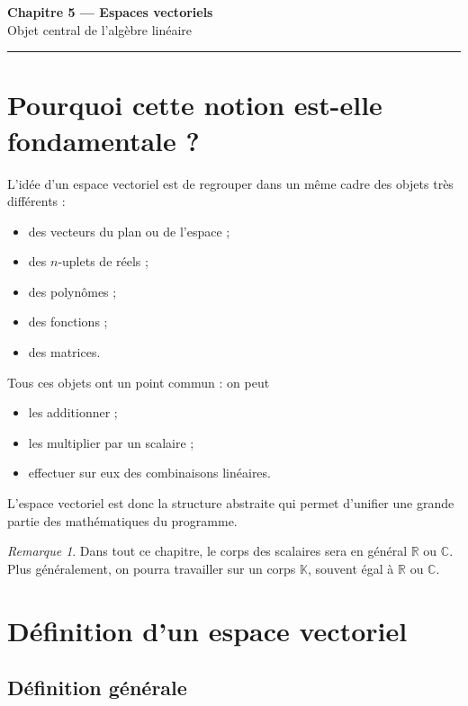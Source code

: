 \documentclass[11pt,a4paper]{article}
\theoremstyle{remark}
\newtheorem{remarque}[definition]{Remarque}
\newcommand{\R}{\mathbb{R}}
\newcommand{\C}{\mathbb{C}}
\newcommand{\K}{\mathbb{K}}
\begin{document}
\begin{center}
    {\LARGE \textbf{Chapitre 5 --- Espaces vectoriels}}\\[0.5em]
    {\large Objet central de l’algèbre linéaire}
\end{center}

\hrule
\vspace{1em}

\tableofcontents

\newpage

\section{Pourquoi cette notion est-elle fondamentale ?}

L’idée d’un espace vectoriel est de regrouper dans un même cadre des objets très différents :
\begin{itemize}
    \item des vecteurs du plan ou de l’espace ;
    \item des \(n\)-uplets de réels ;
    \item des polynômes ;
    \item des fonctions ;
    \item des matrices.
\end{itemize}

Tous ces objets ont un point commun : on peut
\begin{itemize}
    \item les additionner ;
    \item les multiplier par un scalaire ;
    \item effectuer sur eux des combinaisons linéaires.
\end{itemize}

L’espace vectoriel est donc la structure abstraite qui permet d’unifier une grande partie des mathématiques du programme.

\begin{remarque}
Dans tout ce chapitre, le corps des scalaires sera en général \(\R\) ou \(\C\).  
Plus généralement, on pourra travailler sur un corps \(\K\), souvent égal à \(\R\) ou \(\C\).
\end{remarque}

\section{Définition d’un espace vectoriel}

\subsection{Définition générale}
\end{document}
